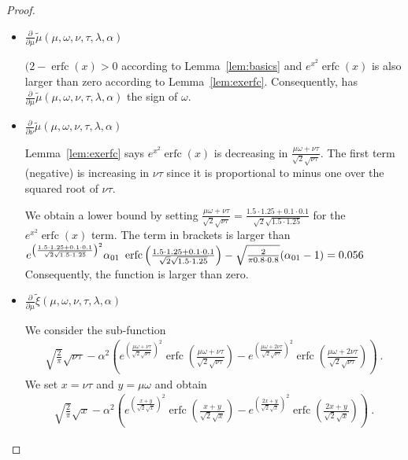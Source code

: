\documentclass{article}
\newcommand\munn{{\tilde \mu}}
\newcommand\xinn{{\tilde \xi}}
\DeclareMathOperator{\erfc}{erfc}
\begin{document}
\begin{proof}
\begin{itemize}
\item $\frac{\partial }{\partial \mu}
\munn(\mu,\omega,\nu,\tau,\lambda ,\alpha )$

$(2 - \erfc (x) > 0$ according to 
Lemma~\ref{lem:basics} and $e^{x^2} \erfc (x)$
is also larger than zero according to Lemma~\ref{lem:exerfc}.
Consequently, has $\frac{\partial }{\partial \mu}
\munn(\mu,\omega,\nu,\tau,\lambda ,\alpha )$
the sign of $\omega$.

\item $\frac{\partial }{\partial \nu}
 \munn(\mu,\omega,\nu,\tau,\lambda ,\alpha )$

Lemma~\ref{lem:exerfc} says 
$e^{x^2} \erfc (x)$ is decreasing in $\frac{\mu \omega+\nu \tau}{\sqrt{2} \sqrt{\nu \tau}}$.
The first term (negative) is increasing in $\nu\tau$ since it is
proportional to minus
one over the squared root of  $\nu\tau$.

We obtain a lower bound by
setting $\frac{\mu \omega+\nu \tau}{\sqrt{2}
  \sqrt{\nu \tau}}=\frac{1.5 \cdot 1.25+0.1 \cdot 0.1}{\sqrt{2}
  \sqrt{1.5 \cdot 1.25}}$ for the $e^{x^2} \erfc (x)$ term.
The term in brackets is larger than
$e^{\left(\frac{1.5 \cdot 1.25+0.1 \cdot 0.1}{\sqrt{2} \sqrt{1.5 \cdot 1.25}}\right)^2}
\alpha_{\rm 01} \ \erfc \left(\frac{1.5 \cdot 1.25+0.1 \cdot 0.1}{\sqrt{2} \sqrt{1.5 \cdot  1.25}}\right)-\sqrt{\frac{2}{\pi  0.8 \cdot 0.8}} (\alpha_{\rm 01}-1)=0.056$
Consequently, the function is larger than zero.


\item $\frac{\partial }{\partial \mu } \xinn(\mu,\omega,\nu,\tau,\lambda ,\alpha )$

We consider the sub-function
\begin{align}
\sqrt{\frac{2}{\pi }} \sqrt{\nu \tau}-\alpha ^2
  \left(e^{\left(\frac{\mu \omega+\nu \tau}{\sqrt{2}
  \sqrt{\nu \tau}}\right)^2}
  \erfc \left(\frac{\mu \omega+\nu \tau}{\sqrt{2}
  \sqrt{\nu \tau}}\right)-e^{\left(\frac{\mu \omega+2
  \nu \tau}{\sqrt{2} \sqrt{\nu \tau}}\right)^2}
  \erfc \left(\frac{\mu \omega+2 \nu \tau}{\sqrt{2}
  \sqrt{\nu \tau}}\right)\right) \ .
\end{align}
We set $x=\nu\tau$ and $y=\mu \omega$ and obtain
\begin{align}
\sqrt{\frac{2}{\pi }} \sqrt{x}-\alpha ^2
  \left(e^{\left(\frac{x+y}{\sqrt{2} \sqrt{x}}\right)^2}
  \erfc \left(\frac{x+y}{\sqrt{2}
  \sqrt{x}}\right)-e^{\left(\frac{2 x+y}{\sqrt{2} \sqrt{x}}\right)^2}
  \erfc \left(\frac{2 x+y}{\sqrt{2} \sqrt{x}}\right)\right) \ .
\end{align}


\end{itemize}
\end{proof}
\end{document}
